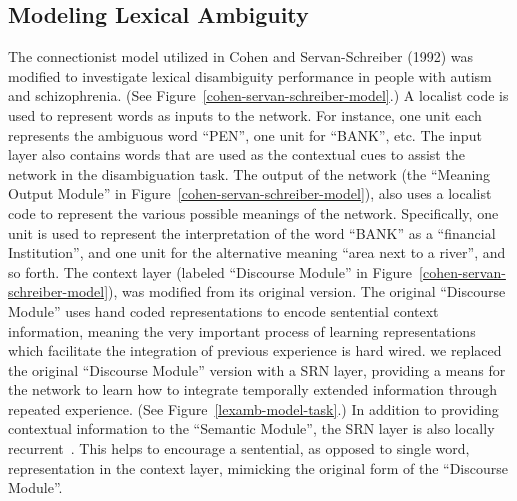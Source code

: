 \documentclass[man]{apa}
\begin{document}
\subsection{Modeling Lexical Ambiguity}
The connectionist model utilized in Cohen and Servan-Schreiber (1992) was modified to investigate lexical disambiguity performance in people with autism and schizophrenia. (See Figure~\ref{cohen-servan-schreiber-model}.)  A localist code is used to represent words as inputs to the network.  For instance, one unit each represents the ambiguous word ``PEN'', one unit for ``BANK'', etc.  The input layer also contains words that are used as the contextual cues to assist the network in the disambiguation task.  The output of the network (the ``Meaning Output Module'' in Figure~\ref{cohen-servan-schreiber-model}), also uses a localist code to represent the various possible meanings of the network.  Specifically, one unit is used to represent the interpretation of the word ``BANK'' as a ``financial Institution'', and one unit for the alternative meaning ``area next to a river'', and so forth.  The context layer (labeled ``Discourse Module'' in Figure~\ref{cohen-servan-schreiber-model}), was modified from its original version.  The original ``Discourse Module'' uses hand coded representations to encode sentential context information, meaning the very important process of learning representations which facilitate the integration of previous experience is hard wired.  we replaced the original ``Discourse Module'' version with a SRN layer, providing a means for the network to learn how to integrate temporally extended information through repeated experience. (See Figure~\ref{lexamb-model-task}.) In addition to providing contextual information to the ``Semantic Module'', the SRN layer is also locally recurrent~\cite{JordanMI:1986:SRN}.  This helps to encourage a sentential, as opposed to single word, representation in the context layer, mimicking the original form of the ``Discourse Module''. 
\end{document}
